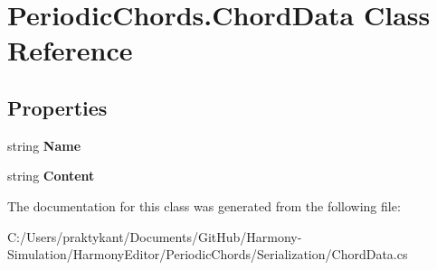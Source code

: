 \hypertarget{class_periodic_chords_1_1_chord_data}{\section{Periodic\+Chords.\+Chord\+Data Class Reference}
\label{class_periodic_chords_1_1_chord_data}
}
\subsection*{Properties}
\begin{DoxyCompactItemize}
\item 
\hypertarget{class_periodic_chords_1_1_chord_data_ac7a2195f6f20d9a7d29ff64addef90f5}{string {\bfseries Name}}\label{class_periodic_chords_1_1_chord_data_ac7a2195f6f20d9a7d29ff64addef90f5}

\item 
\hypertarget{class_periodic_chords_1_1_chord_data_ae5e673721b1313237f570c7b5d8c17a4}{string {\bfseries Content}}\label{class_periodic_chords_1_1_chord_data_ae5e673721b1313237f570c7b5d8c17a4}

\end{DoxyCompactItemize}


The documentation for this class was generated from the following file\+:\begin{DoxyCompactItemize}
\item 
C\+:/\+Users/praktykant/\+Documents/\+Git\+Hub/\+Harmony-\/\+Simulation/\+Harmony\+Editor/\+Periodic\+Chords/\+Serialization/Chord\+Data.\+cs\end{DoxyCompactItemize}
